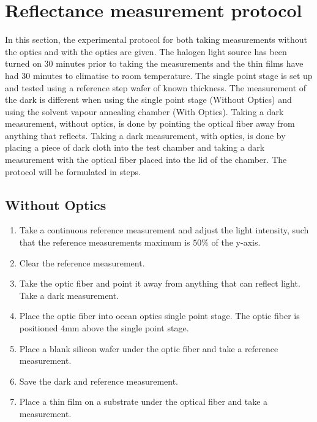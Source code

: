 \documentclass[MasterThesisMain.tex]{subfiles}
\begin{document}
\section{Reflectance measurement protocol}
In this section, the experimental protocol for both taking measurements without the optics and with the optics are given. The halogen light source has been turned on 30 minutes prior to taking the measurements and the thin films have had 30 minutes to climatise to room temperature. The single point stage is set up and tested using a reference step wafer of known thickness. The measurement of the dark is different when using the single point stage (Without Optics) and using the solvent vapour annealing chamber (With Optics). Taking a dark measurement, without optics, is done by pointing the optical fiber away from anything that reflects. Taking a dark measurement, with optics, is done by placing a piece of dark cloth into the test chamber and taking a dark measurement with the optical fiber placed into the lid of the chamber. The protocol will be formulated in steps.

\subsection{Without Optics}
\begin{enumerate}
\item Take a continuous reference measurement and adjust the light intensity, such that the reference measurements maximum is $50\%$ of the y-axis.
\item Clear the reference measurement.
\item Take the optic fiber and point it away from anything that can reflect light. Take a dark measurement.
\item Place the optic fiber into ocean optics single point stage. The optic fiber is positioned $4$mm above the single point stage.
\item Place a blank silicon wafer under the optic fiber and take a reference measurement.
\item Save the dark and reference measurement.
\item Place a thin film on a substrate under the optical fiber and take a measurement.  
\end{enumerate}
\end{document}

